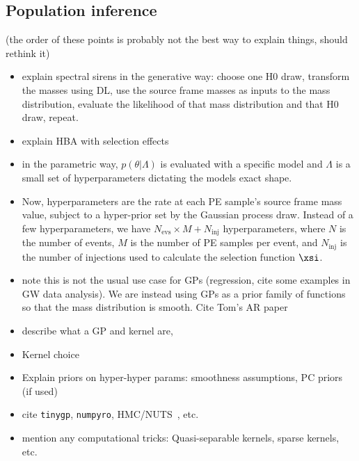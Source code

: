 \documentclass[twocolumn]{aastex631}
\begin{document}
\subsection{Population inference}
(the order of these points is probably not the best way to explain things, should rethink it)
\begin{itemize}
    \item explain spectral sirens in the generative way: choose one H0 draw, transform the masses using DL, use the source frame masses as inputs to the mass distribution, evaluate the likelihood of that mass distribution and that H0 draw, repeat.
    \item explain HBA with selection effects
    \item in the parametric way, $p(\theta|\Lambda)$ is evaluated with a specific model and $\Lambda$ is a small set of hyperparameters dictating the models exact shape. 
    \item Now, hyperparameters are the rate at each PE sample's source frame mass value, subject to a hyper-prior set by the Gaussian process draw. Instead of a few hyperparameters, we have $N_{\text{evs}}\times M + N_{\text{inj}}$ hyperparameters, where $N$ is the number of events, $M$ is the number of PE samples per event, and $N_{\text{inj}}$ is the number of injections used to calculate the selection function $\xsi$.
    \item note this is not the usual use case for GPs (regression, cite some examples in GW data analysis). We are instead using GPs as a prior family of functions so that the mass distribution is smooth. Cite Tom's AR paper
    \item describe what a GP and kernel are, \citep{}
    \item Kernel choice
    \item Explain priors on hyper-hyper params: smoothness assumptions, PC priors~\citep{simpson_penalising_2017} (if used)
    \item cite \texttt{tinygp}, \texttt{numpyro}, HMC/NUTS~\citep{hoffman_no-u-turn_2011}, etc.
    \item mention any computational tricks: Quasi-separable kernels, sparse kernels, etc.
\end{itemize}


\end{document}
